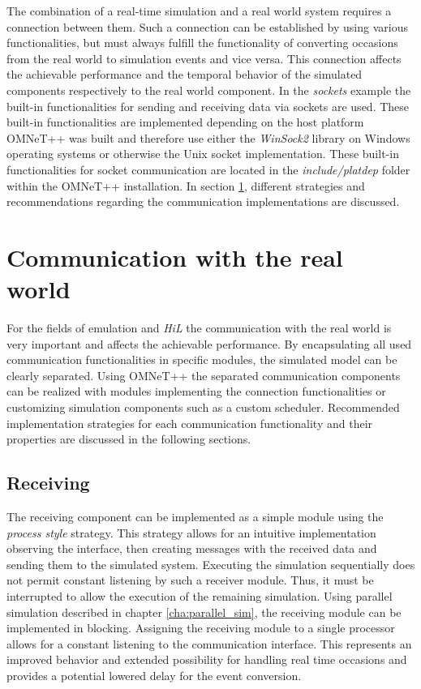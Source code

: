 The combination of a real-time simulation and a real world system requires a connection between them.
Such a connection can be established by using various functionalities, but must always fulfill the functionality of converting occasions from the real world to simulation events and vice versa.
This connection affects the achievable performance and the temporal behavior of the simulated components respectively to the real world component.
In the \emph{sockets} example the built-in functionalities for sending and receiving data via sockets are used.
These built-in functionalities are implemented depending on the host platform OMNeT++ was built and therefore use either the \emph{WinSock2} library on Windows operating systems or otherwise the Unix socket implementation.
These built-in functionalities for socket communication are located in the \emph{include/platdep} folder within the OMNeT++ installation.
In section \ref{sec:emulation_communication}, different strategies and recommendations regarding the communication implementations are discussed.

\section{Communication with the real world}
\label{sec:emulation_communication}
For the fields of emulation and \emph{HiL} the communication with the real world is very important and affects the achievable performance.
By encapsulating all used communication functionalities in specific modules, the simulated model can be clearly separated.
Using OMNeT++ the separated communication components can be realized with modules implementing the connection functionalities or customizing simulation components such as a custom scheduler.
Recommended implementation strategies for each communication functionality and their properties are discussed in the following sections.

\subsection{Receiving}
\label{sec:emulation_communication_receiving}

The receiving component can be implemented as a simple module using the \emph{process style} strategy.
This strategy allows for an intuitive implementation observing the interface, then creating messages with the received data and sending them to the simulated system.
Executing the simulation sequentially does not permit constant listening by such a receiver module.
Thus, it must be interrupted to allow the execution of the remaining simulation.
Using parallel simulation described in chapter \ref{cha:parallel_sim}, the receiving module can be implemented in blocking.
Assigning the receiving module to a single processor allows for a constant listening to the communication interface.
This represents an improved behavior and extended possibility for handling real time occasions and provides a potential lowered delay for the event conversion.

